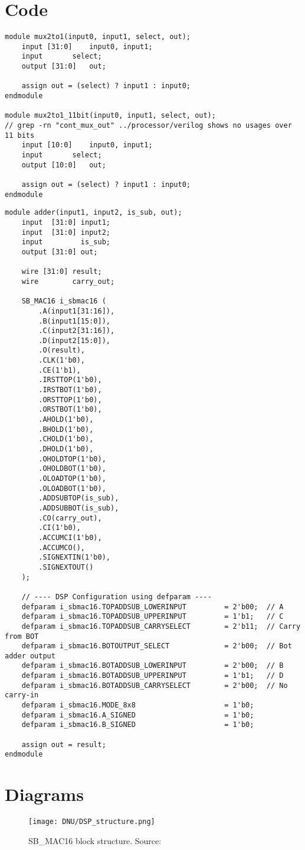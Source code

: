 \documentclass[a4paper,10pt]{article}
\begin{document}
\section{Code}

\begin{lstlisting}[style=verilog-style, caption=
    {Fixed-width 11-bit multiplexer}, label={prog:mux_11bit}]
module mux2to1(input0, input1, select, out);
	input [31:0]	input0, input1;
	input		select;
	output [31:0]	out;

	assign out = (select) ? input1 : input0;
endmodule

module mux2to1_11bit(input0, input1, select, out); 
// grep -rn "cont_mux_out" ../processor/verilog shows no usages over 11 bits
	input [10:0]	input0, input1;
	input		select;
	output [10:0]	out;

	assign out = (select) ? input1 : input0;
endmodule
\end{lstlisting}

\begin{lstlisting}[style=verilog-style, caption=
    {DSP implementation in adder.v}, label={prog:DSP}]
module adder(input1, input2, is_sub, out);
    input  [31:0] input1;
    input  [31:0] input2;
    input         is_sub;
    output [31:0] out;

    wire [31:0] result;
    wire        carry_out;

    SB_MAC16 i_sbmac16 (
        .A(input1[31:16]),  
        .B(input1[15:0]),  
        .C(input2[31:16]), 
        .D(input2[15:0]),  
        .O(result),
        .CLK(1'b0),
        .CE(1'b1),
        .IRSTTOP(1'b0), 
        .IRSTBOT(1'b0),
        .ORSTTOP(1'b0), 
        .ORSTBOT(1'b0),
        .AHOLD(1'b0), 
        .BHOLD(1'b0),
        .CHOLD(1'b0), 
        .DHOLD(1'b0),
        .OHOLDTOP(1'b0),
        .OHOLDBOT(1'b0),
        .OLOADTOP(1'b0), 
        .OLOADBOT(1'b0),
        .ADDSUBTOP(is_sub), 
        .ADDSUBBOT(is_sub),
        .CO(carry_out),
        .CI(1'b0), 
        .ACCUMCI(1'b0),
        .ACCUMCO(), 
        .SIGNEXTIN(1'b0), 
        .SIGNEXTOUT()
    );

    // ---- DSP Configuration using defparam ----
    defparam i_sbmac16.TOPADDSUB_LOWERINPUT         = 2'b00;  // A
    defparam i_sbmac16.TOPADDSUB_UPPERINPUT         = 1'b1;   // C
    defparam i_sbmac16.TOPADDSUB_CARRYSELECT        = 2'b11;  // Carry from BOT
    defparam i_sbmac16.BOTOUTPUT_SELECT             = 2'b00;  // Bot adder output
    defparam i_sbmac16.BOTADDSUB_LOWERINPUT         = 2'b00;  // B
    defparam i_sbmac16.BOTADDSUB_UPPERINPUT         = 1'b1;   // D
    defparam i_sbmac16.BOTADDSUB_CARRYSELECT        = 2'b00;  // No carry-in
    defparam i_sbmac16.MODE_8x8                     = 1'b0;
    defparam i_sbmac16.A_SIGNED                     = 1'b0;
    defparam i_sbmac16.B_SIGNED                     = 1'b0;

    assign out = result;
endmodule
\end{lstlisting}

\section{Diagrams}

\begin{figure}[H]
    \centering
    \texttt{[image: DNU/DSP\_structure.png]}
    \caption{SB\_MAC16 block structure. Source: \cite{DSP_guide}}
    \label{fig:dsp}
\end{figure}
\end{document}
